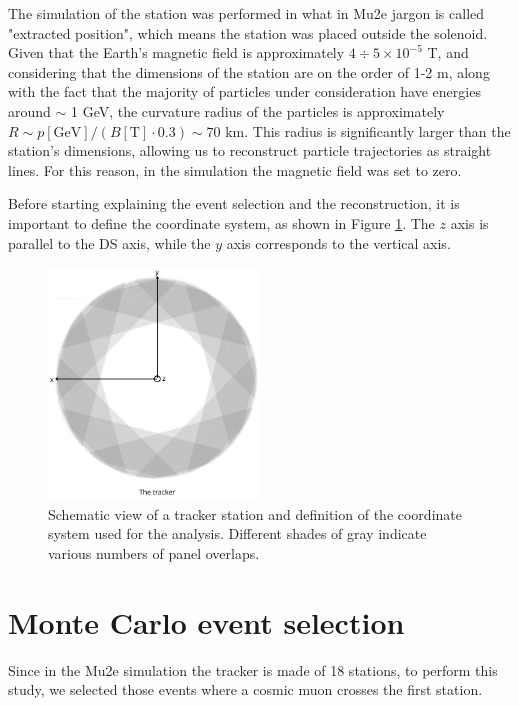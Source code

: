 The simulation of the station was performed in what in Mu2e jargon is called
"extracted position", which means the station was placed outside the solenoid.
Given that the Earth's magnetic field is approximately 
$4 \div 5 \times 10^{-5}$ T, 
and considering that the dimensions of the station are 
on the order of 1-2 m, 
along with the fact that the majority of particles under consideration
have energies around $\sim$ 1 GeV, 
the curvature radius of the particles is approximately 
$R\sim p[\text{GeV}]/(B[\text{T}]\cdot 0.3) \sim 70$ km. 
This radius is significantly larger than the station's 
dimensions, allowing us to reconstruct particle trajectories 
as straight lines.
For this reason, in the simulation  
the magnetic field was set to zero. 

Before starting explaining the event selection and the 
reconstruction, it is important to define the coordinate system, 
as shown in Figure \ref{fig:coordinate}. The $z$ axis is parallel to 
the DS axis, while the $y$ axis corresponds to the vertical axis.
\begin{figure}[!h]
    \centering
    \includegraphics[width =0.5\textwidth]{figures/png/Screenshot_20240526_164527.png}
    \caption[Schematic view of a tracker station and 
    the coordinate system.]{Schematic view of a tracker station 
    and definition of the coordinate system used for the analysis. 
    Different shades of gray indicate various numbers of panel overlaps.}
    \label{fig:coordinate}
\end{figure}
\section{Monte Carlo event selection}\label{eventselection}

Since in the Mu2e simulation the tracker is made of 18 stations, to 
perform this study, we selected those events where a 
cosmic muon crosses the first station.

